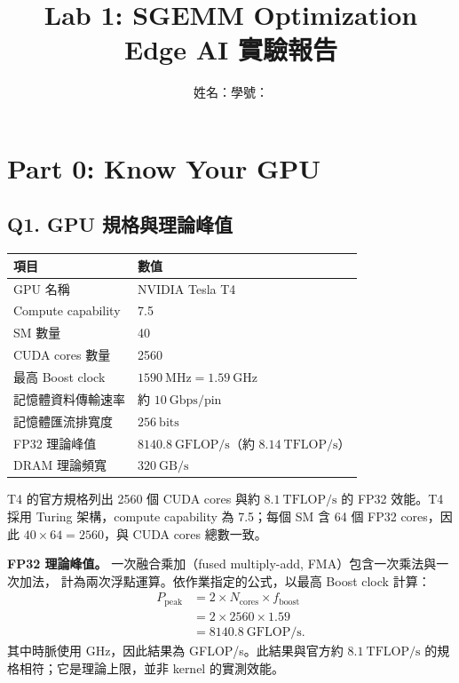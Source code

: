 \documentclass[UTF8,fontset=none,11pt,a4paper]{ctexart}
\title{\textbf{Lab 1: SGEMM Optimization}\\[0.3em]
       \large Edge AI 實驗報告}
\author{姓名：\studentname\qquad 學號：\studentid}
\date{}
\begin{document}
\maketitle

\section*{Part 0: Know Your GPU}

\subsection*{Q1. GPU 規格與理論峰值}

\begin{center}
\begin{tabularx}{\linewidth}{@{}lX@{}}
\toprule
項目 & 數值 \\
\midrule
GPU 名稱 & NVIDIA Tesla T4 \\
Compute capability & 7.5 \\
SM 數量 & 40 \\
CUDA cores 數量 & 2560 \\
最高 Boost clock & $1590\ \mathrm{MHz}=1.59\ \mathrm{GHz}$ \\
記憶體資料傳輸速率 & 約 $10\ \mathrm{Gbps/pin}$ \\
記憶體匯流排寬度 & $256\ \mathrm{bits}$ \\
FP32 理論峰值 & $8140.8\ \mathrm{GFLOP/s}$（約 $8.14\ \mathrm{TFLOP/s}$）\\
DRAM 理論頻寬 & $320\ \mathrm{GB/s}$ \\
\bottomrule
\end{tabularx}
\end{center}

T4 的官方規格列出 2560 個 CUDA cores 與約 $8.1\ \mathrm{TFLOP/s}$
的 FP32 效能。T4 採用 Turing 架構，compute capability 為 7.5；每個 SM 含 64 個
FP32 cores，因此 $40\times64=2560$，與 CUDA cores 總數一致。

\textbf{FP32 理論峰值。}
一次融合乘加（fused multiply-add, FMA）包含一次乘法與一次加法，
計為兩次浮點運算。依作業指定的公式，以最高 Boost clock 計算：
\begin{align*}
P_{\mathrm{peak}}
  &=2\times N_{\mathrm{cores}}\times f_{\mathrm{boost}}\\
  &=2\times2560\times1.59\\
  &=8140.8\ \mathrm{GFLOP/s}.
\end{align*}
其中時脈使用 GHz，因此結果為 GFLOP/s。此結果與官方約
$8.1\ \mathrm{TFLOP/s}$ 的規格相符；它是理論上限，並非 kernel 的實測效能。
\end{document}

